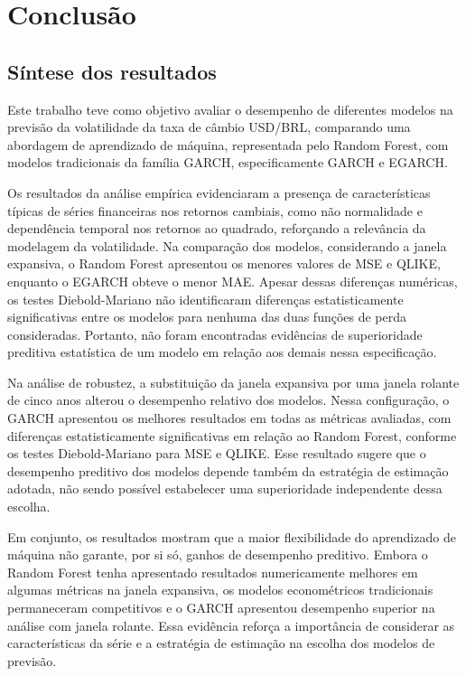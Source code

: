 \chapter{Conclusão}

\section{Síntese dos resultados}

Este trabalho teve como objetivo avaliar o desempenho de diferentes modelos na previsão da volatilidade da taxa de câmbio 
USD/BRL, comparando uma abordagem de aprendizado de máquina, representada pelo Random Forest, com modelos tradicionais da 
família GARCH, especificamente GARCH e EGARCH.

Os resultados da análise empírica evidenciaram a presença de características típicas de séries financeiras nos retornos 
cambiais, como não normalidade e dependência temporal nos retornos ao quadrado, reforçando a relevância da modelagem da 
volatilidade. Na comparação dos modelos, considerando a janela expansiva, o Random Forest apresentou os menores valores 
de MSE e QLIKE, enquanto o EGARCH obteve o menor MAE. Apesar dessas diferenças numéricas, os testes Diebold-Mariano não 
identificaram diferenças estatisticamente significativas entre os modelos para nenhuma das duas funções de perda consideradas.
Portanto, não foram encontradas evidências de superioridade preditiva estatística de um modelo em relação aos demais nessa 
especificação.

Na análise de robustez, a substituição da janela expansiva por uma janela rolante de cinco anos alterou o desempenho relativo 
dos modelos. Nessa configuração, o GARCH apresentou os melhores resultados em todas as métricas avaliadas, com diferenças 
estatisticamente significativas em relação ao Random Forest, conforme os testes Diebold-Mariano para MSE e QLIKE. Esse resultado 
sugere que o desempenho preditivo dos modelos depende também da estratégia de estimação adotada, não sendo possível 
estabelecer uma superioridade independente dessa escolha.

Em conjunto, os resultados mostram que a maior flexibilidade do aprendizado de máquina não garante, por si só, ganhos de desempenho 
preditivo. Embora o Random Forest tenha apresentado resultados numericamente melhores em algumas métricas na janela expansiva, os 
modelos econométricos tradicionais permaneceram competitivos e o GARCH apresentou desempenho superior na análise com janela rolante. 
Essa evidência reforça a importância de considerar as características da série e a estratégia de estimação na escolha dos modelos de 
previsão.

